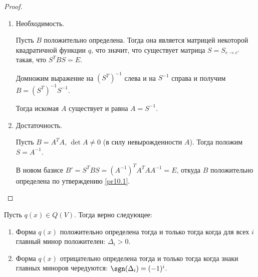 \begin{proof}~
    \begin{enumerate}
        \item Необходимость.
        
        Пусть $B$ положительно определена. Тогда она является матрицей некоторой 
        квадратичной функции $q$, что значит, что существует матрица $S = S_{e \to e'}$ такая, что 
        $S^T B S = E$. 
        
        Домножим выражение на $(S^T)^{-1}$ слева и на $S^{-1}$ справа и получим $B = (S^T)^{-1} S^{-1}$.

        Тогда искомая $A$ существует и равна $A = S^{-1}$. 
        \item Достаточность.
        
        Пусть $B = A^T A$, $\det A \neq 0$ (в силу невырожденности $A$). Тогда положим $S = A^{-1}$. 

        В новом базисе $B' = S^TBS = (A^{-1})^T A^T A A^{-1} = E$, откуда $B$ положительно определена по 
        утверждению \ref{pr10.1}.
    \end{enumerate}
\end{proof}

\begin{theorem}
    Пусть $q(x) \in Q(V)$. Тогда верно следующее:
    \begin{enumerate}
        \item Форма $q(x)$ положительно определена тогда и только тогда когда для всех $i$ главный минор 
        положителен: $\Delta_i > 0$.
        \item Форма $q(x)$ отрицательно определена тогда и только тогда когда знаки главных миноров чередуются:
        $\sgn(\Delta_i) = (-1)^i$.
    \end{enumerate}
\end{theorem}

